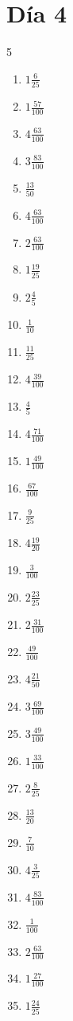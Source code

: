 \documentclass[12pt]{article}
\begin{document}
\section*{Día 4}
\begin{multicols}{5}\begin{enumerate}
		\item $ 1 \frac{6}{25} $
		\item $ 1 \frac{57}{100} $
		\item $ 4 \frac{63}{100} $
		\item $ 3 \frac{83}{100} $
		\item $ \frac{13}{50} $
		\item $ 4 \frac{63}{100} $
		\item $ 2 \frac{63}{100} $
		\item $ 1 \frac{19}{25} $
		\item $ 2 \frac{4}{5} $
		\item $ \frac{1}{10} $
		\item $ \frac{11}{25} $
		\item $ 4 \frac{39}{100} $
		\item $ \frac{4}{5} $
		\item $ 4 \frac{71}{100} $
		\item $ 1 \frac{49}{100} $
		\item $ \frac{67}{100} $
		\item $ \frac{9}{25} $
		\item $ 4 \frac{19}{20} $
		\item $ \frac{3}{100} $
		\item $ 2 \frac{23}{25} $
		\item $ 2 \frac{31}{100} $
		\item $ \frac{49}{100} $
		\item $ 4 \frac{21}{50} $
		\item $ 3 \frac{69}{100} $
		\item $ 3 \frac{49}{100} $
		\item $ 1 \frac{33}{100} $
		\item $ 2 \frac{8}{25} $
		\item $ \frac{13}{20} $
		\item $ \frac{7}{10} $
		\item $ 4 \frac{3}{25} $
		\item $ 4 \frac{83}{100} $
		\item $ \frac{1}{100} $
		\item $ 2 \frac{63}{100} $
		\item $ 1 \frac{27}{100} $
		\item $ 1 \frac{24}{25} $

\end{enumerate}
\end{multicols}
\end{document}
